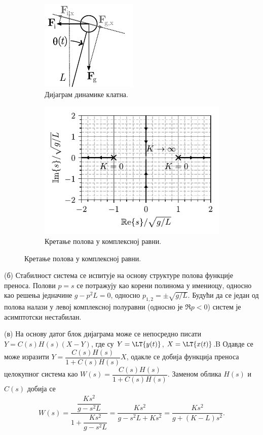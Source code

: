 \begin{figure}[ht!]
    \centering
    \begin{subfigure}{0.39\textwidth}
        \centering
        \includegraphics{fig/klatno_dinamika.pdf}
        \caption{Дијаграм динамике клатна.}
        \label{fig:\ID.2}
    \end{subfigure}
    \begin{subfigure}{0.59\textwidth}
        \centering
        \includegraphics{fig/pmap_klatno_edit.pdf}
        \caption{Кретање полова у комплексној равни.}
        \label{fig:\ID.3}
    \end{subfigure}
\end{figure}


(б) Стабилност система се испитује на основу структуре полова функције преноса. Полови $p=s$ се потражују као корени полинома у имениоцу, односно као 
решења једначине $g - p^2L = 0$, односно $p_{1,2} = \pm \sqrt{g/L}$. Будући да се један од полова налази у левој комплексној полуравни (односно је 
$\Re{p} < 0$) систем је асимптотски нестабилан. 

(в) 
На основу датог блок дијаграма може се непосредно писати 
$Y = C(s)H(s)( X - Y )$, где су $Y = \LT{y(t)}$, $X = \LT{x(t)}$.B Одавде се може изразити 
$Y = \dfrac{C(s)H(s)}{1 + C(s)H(s)} X$, одакле се добија функција преноса 
целокупног система као $W(s) = \dfrac{C(s)H(s)}{1 + C(s)H(s)}$. Заменом облика $H(s)$ и $C(s)$ добија се 
\begin{eqnarray}
    W(s) = \dfrac{ \dfrac{Ks^2}{g - s^2L} }{ 1  + \dfrac{Ks^2}{g - s^2L}} = 
    \dfrac{ Ks^2 }{ g - s^2L + Ks^2} = \dfrac{ Ks^2 }{ g + (K-L)s^2}. 
\end{eqnarray}

